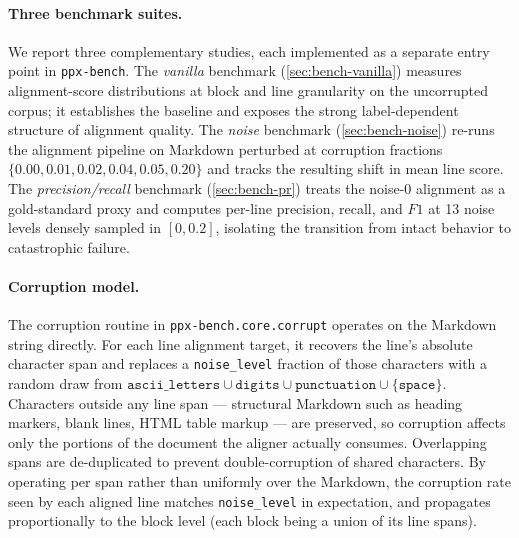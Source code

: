 \documentclass{article}
\theoremstyle{definition}
\begin{document}
\paragraph{Three benchmark suites.}
We report three complementary studies, each implemented as a separate
entry point in \texttt{ppx-bench}.  The \emph{vanilla} benchmark
(\cref{sec:bench-vanilla}) measures alignment-score distributions at
block and line granularity on the uncorrupted corpus; it establishes
the baseline and exposes the strong label-dependent structure of
alignment quality.  The \emph{noise} benchmark
(\cref{sec:bench-noise}) re-runs the alignment pipeline on Markdown
perturbed at corruption fractions
$\{0.00, 0.01, 0.02, 0.04, 0.05, 0.20\}$ and tracks the resulting
shift in mean line score.  The \emph{precision/recall} benchmark
(\cref{sec:bench-pr}) treats the noise-$0$ alignment as a gold-standard
proxy and computes per-line precision, recall, and $F1$ at 13 noise
levels densely sampled in $[0, 0.2]$, isolating the transition from
intact behavior to catastrophic failure.

\paragraph{Corruption model.}
The corruption routine in \texttt{ppx-bench.core.corrupt} operates on
the Markdown string directly.  For each line alignment target, it
recovers the line's absolute character span and replaces a
\texttt{noise\_level} fraction of those characters with a random draw
from
$\texttt{ascii\_letters} \cup \texttt{digits} \cup \texttt{punctuation} \cup \{\texttt{space}\}$.
Characters outside any line span --- structural Markdown such as
heading markers, blank lines, HTML table markup --- are preserved, so
corruption affects only the portions of the document the aligner
actually consumes.  Overlapping spans are de-duplicated to prevent
double-corruption of shared characters.  By operating per span rather
than uniformly over the Markdown, the corruption rate seen by each
aligned line matches \texttt{noise\_level} in expectation, and
propagates proportionally to the block level (each block being a union
of its line spans).
\end{document}
